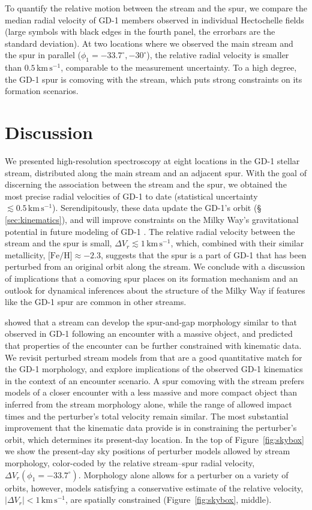 \documentclass[twocolumn]{aastex63}
\newcommand{\kms}{\ensuremath{\textrm{km}\,\textrm{s}^{-1}}}
\newcommand{\feh}{\ensuremath{\textrm{[Fe/H]}}}
\begin{document}
To quantify the relative motion between the stream and the spur, we compare the median radial velocity of GD-1 members observed in individual Hectochelle fields (large symbols with black edges in the fourth panel, the errorbars are the standard deviation).
At two locations where we observed the main stream and the spur in parallel ($\phi_1=-33.7^\circ, -30^\circ$), the relative radial velocity is smaller than $0.5\,\kms$, comparable to the measurement uncertainty.
To a high degree, the GD-1 spur is comoving with the stream, which puts strong constraints on its formation scenarios.


\section{Discussion}
\label{sec:discussion}

We presented high-resolution spectroscopy at eight locations in the GD-1 stellar stream, distributed along the main stream and an adjacent spur.
With the goal of discerning the association between the stream and the spur, we obtained the most precise radial velocities of GD-1 to date (statistical uncertainty $\lesssim0.5\,\kms$).
Serendipitously, these data update the GD-1's orbit (\S\,\ref{sec:kinematics}), and will improve constraints on the Milky Way's gravitational potential in future modeling of GD-1 \citep[similar to, e.g.,][]{koposov2010, bowden2015, bovy2016}.
The relative radial velocity between the stream and the spur is small, $\Delta V_r\lesssim1\,\kms$, which, combined with their similar metallicity, $\feh\approx-2.3$, suggests that the spur is a part of GD-1 that has been perturbed from an original orbit along the stream.
We conclude with a discussion of implications that a comoving spur places on its formation mechanism and an outlook for dynamical inferences about the structure of the Milky Way if features like the GD-1 spur are common in other streams.

\citet{bonaca2019a} showed that a stream can develop the spur-and-gap morphology similar to that observed in GD-1 following an encounter with a massive object, and predicted that properties of the encounter can be further constrained with kinematic data.
We revisit perturbed stream models from \citet{bonaca2019a} that are a good quantitative match for the GD-1 morphology, and explore implications of the observed GD-1 kinematics in the context of an encounter scenario.
A spur comoving with the stream prefers models of a closer encounter with a less massive and more compact object than inferred from the stream morphology alone, while the range of allowed impact times and the perturber's total velocity remain similar.
The most substantial improvement that the kinematic data provide is in constraining the perturber's orbit, which determines its present-day location.
In the top of Figure~\ref{fig:skybox} we show the present-day sky positions of perturber models allowed by stream morphology, color-coded by the relative stream--spur radial velocity, $\Delta V_r(\phi_1=-33.7^\circ)$.
Morphology alone allows for a perturber on a variety of orbits, however, models satisfying a conservative estimate of the relative velocity, $|\Delta V_r|<1\,\kms$, are spatially constrained (Figure~\ref{fig:skybox}, middle).
\end{document}
